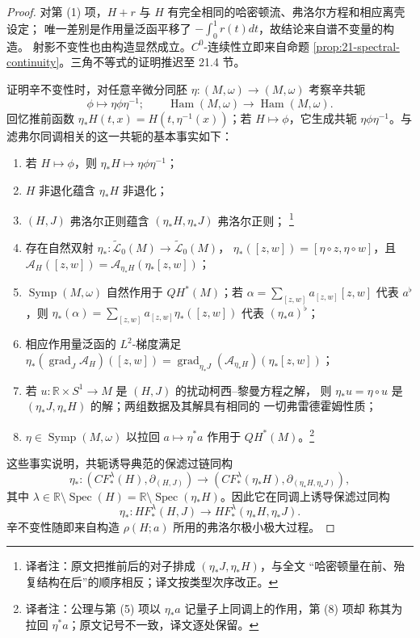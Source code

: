\begin{proof}
对第 (1) 项，$H+r$ 与 $H$ 有完全相同的哈密顿流、弗洛尔方程和相应离壳设定；
唯一差别是作用量泛函平移了 $-\int_0^1r(t)dt$，故结论来自谱不变量的构造。
射影不变性也由构造显然成立。$C^0$-连续性立即来自命题
\ref{prop:21-spectral-continuity}。三角不等式的证明推迟至 21.4 节。

证明辛不变性时，对任意辛微分同胚 $\eta:(M,\omega)\to(M,\omega)$ 考察辛共轭
\[
 \phi\longmapsto\eta\phi\eta^{-1};\qquad
 \operatorname{Ham}(M,\omega)\longrightarrow\operatorname{Ham}(M,\omega).
\]
回忆推前函数 $\eta_*H(t,x)=H(t,\eta^{-1}(x))$；若 $H\mapsto\phi$，它生成共轭
$\eta\phi\eta^{-1}$。与滤弗尔同调相关的这一共轭的基本事实如下：
\begin{enumerate}[label=(\arabic*)]
 \item 若 $H\mapsto\phi$，则 $\eta_*H\mapsto\eta\phi\eta^{-1}$；
 \item $H$ 非退化蕴含 $\eta_*H$ 非退化；
 \item $(H,J)$ 弗洛尔正则蕴含 $(\eta_*H,\eta_*J)$ 弗洛尔正则；
 \footnote{译者注：原文把推前后的\personFloer{}对子排成 $(\eta_*J,\eta_*H)$，与全文
“哈密顿量在前、殆复结构在后”的顺序相反；译文按类型次序改正。}
 \item 存在自然双射
 $\eta_*:\widetilde{\mathcal L}_0(M)\to\widetilde{\mathcal L}_0(M)$，
 $\eta_*([z,w])=[\eta\circ z,\eta\circ w]$，且
 $\mathcal A_H([z,w])=\mathcal A_{\eta_*H}(\eta_*[z,w])$；
 \item $\operatorname{Symp}(M,\omega)$ 自然作用于 $QH^*(M)$；若
 $\alpha=\sum_{[z,w]}a_{[z,w]}[z,w]$ 代表 $a^\flat$，则
 $\eta_*(\alpha)=\sum_{[z,w]}a_{[z,w]}\eta_*([z,w])$ 代表 $(\eta_*a)^\flat$；
 \item 相应作用量泛函的 $L^2$-梯度满足
 $\eta_*(\operatorname{grad}_J\mathcal A_H)([z,w])
 =\operatorname{grad}_{\eta_*J}(\mathcal A_{\eta_*H})(\eta_*[z,w])$；
 \item 若 $u:\mathbb R\times S^1\to M$ 是 $(H,J)$ 的扰动柯西--黎曼方程之解，
 则 $\eta_*u=\eta\circ u$ 是 $(\eta_*J,\eta_*H)$ 的解；两组数据及其解具有相同的
 一切弗雷德霍姆性质；
 \item $\eta\in\operatorname{Symp}(M,\omega)$ 以拉回 $a\mapsto\eta^*a$ 作用于
 $QH^*(M)$。\footnote{译者注：公理与第 (5) 项以 $\eta_*a$ 记量子上同调上的作用，第 (8) 项却
称其为拉回 $\eta^*a$；原文记号不一致，译文逐处保留。}
\end{enumerate}
这些事实说明，共轭诱导典范的保滤过链同构
\[
 \eta_*:(CF_*^\lambda(H),\partial_{(H,J)})\longrightarrow
 (CF_*^\lambda(\eta_*H),\partial_{(\eta_*H,\eta_*J)}),
\]
其中 $\lambda\in\mathbb R\setminus\operatorname{Spec}(H)
=\mathbb R\setminus\operatorname{Spec}(\eta_*H)$。因此它在同调上诱导保滤过同构
\[
 \eta_*:HF_*^\lambda(H,J)\longrightarrow HF_*^\lambda(\eta_*H,\eta_*J).
\]
辛不变性随即来自构造 $\rho(H;a)$ 所用的弗洛尔极小极大过程。
\end{proof}

